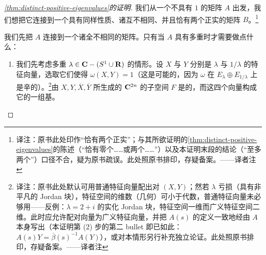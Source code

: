 \begin{proof}[\cref{thm:distinct-positive-eigenvalues}的证明]
我们从一个不具有\trEigenvalue{} $1$ 的\trSymplectic{}矩阵 $A$ 出发，我们想把它连接到一个具有同样性质、诸\trEigenvalue{}互不相同、并且恰有两个正实\trEigenvalue{}的矩阵 $B$。\footnote{译注：原书此处印作“恰有两个正实\trEigenvalue”；与其所欲证明的\cref{thm:distinct-positive-eigenvalues}的陈述（“恰有零个……或两个……”）以及本证明末段的结论（“至多两个”）口径不合，疑为原书疏误。此处照原书排印，存疑备案。——译者注}

我们先把 $A$ 连接到一个诸\trEigenvalue{}全不相同的\trSymplectic{}矩阵。只有当 $A$ 具有多重\trEigenvalue{}时才需要做点什么：
\begin{enumerate}[label=(\arabic*)]
\item 我们先考虑多重\trEigenvalue{} $\lambda\in\mathbf{C}-(S^1\cup\mathbf{R})$ 的情形。设 $X$ 与 $Y$ 分别是 $\lambda$ 与 $1/\lambda$ 的特征向量，选取它们使得 $\omega(X,Y)=1$（这是可能的，因为 $\omega$ 在 $E_\lambda\oplus E_{1/\lambda}$ 上是辛的）。\footnote{译注：原书此处默认可用普通特征向量配出对 $(X,Y)$；然若 $\lambda$ 亏损（具有非平凡的 Jordan 块），特征空间的维数（几何\trMultiplicity）可小于代数\trMultiplicity，普通特征向量未必够用——反例：$\lambda=2+i$ 的实化 Jordan 块，特征空间一维而广义特征空间二维。此时应允许配对向量为广义特征向量，并把 $A(s)$ 的定义一致地经由 $A$ 本身写出（本证明第 (2) 步的第二 bullet 即已如此：$A(s)Y=\overline{\beta}(s)^{-1}A(Y)$），或对本情形另行补充独立论证。此处照原书排印，存疑备案。——译者注}由 $X,Y,\overline{X},\overline{Y}$ 所生成的 $\mathbf{C}^{2n}$ 的子空间 $F$ 是\trSymplectic{}的，而这四个向量构成它的一组\trSymplectic{}基。


\end{enumerate}
\end{proof}
